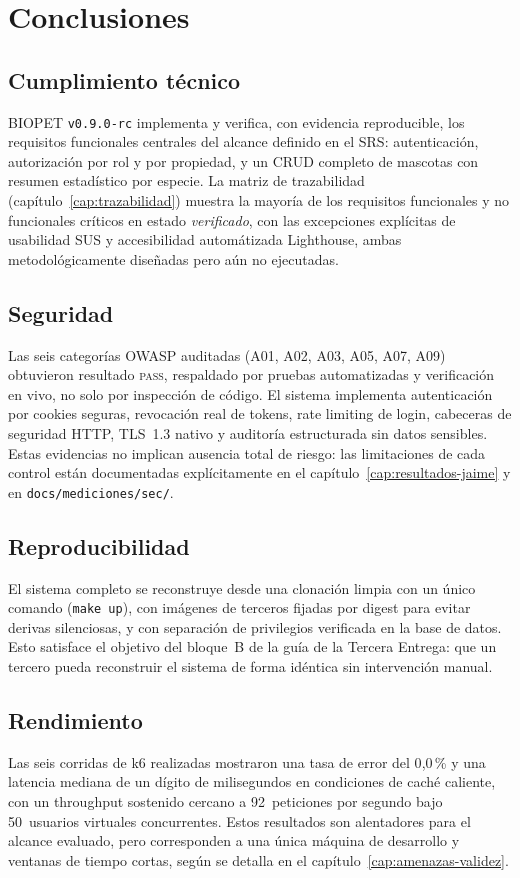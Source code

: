 \chapter{Conclusiones}
\label{cap:conclusiones}

\section{Cumplimiento t\'ecnico}
BIOPET \texttt{v0.9.0-rc} implementa y verifica, con evidencia
reproducible, los requisitos funcionales centrales del alcance definido en
el SRS: autenticaci\'on, autorizaci\'on por rol y por propiedad, y un CRUD
completo de mascotas con resumen estad\'istico por especie. La matriz de
trazabilidad (cap\'itulo~\ref{cap:trazabilidad}) muestra la mayor\'ia de los
requisitos funcionales y no funcionales cr\'iticos en estado
\emph{verificado}, con las excepciones expl\'icitas de usabilidad SUS y
accesibilidad autom\'atizada Lighthouse, ambas metodol\'ogicamente
dise\~nadas pero a\'un no ejecutadas.

\section{Seguridad}
Las seis categor\'ias OWASP auditadas (A01, A02, A03, A05, A07, A09)
obtuvieron resultado \textsc{pass}, respaldado por pruebas automatizadas y
verificaci\'on en vivo, no solo por inspecci\'on de c\'odigo. El sistema
implementa autenticaci\'on por cookies seguras, revocaci\'on real de
tokens, rate limiting de login, cabeceras de seguridad HTTP, TLS~1.3 nativo
y auditor\'ia estructurada sin datos sensibles. Estas evidencias no
implican ausencia total de riesgo: las limitaciones de cada control est\'an
documentadas expl\'icitamente en el cap\'itulo~\ref{cap:resultados-jaime} y
en \texttt{docs/mediciones/sec/}.

\section{Reproducibilidad}
El sistema completo se reconstruye desde una clonaci\'on limpia con un
\'unico comando (\texttt{make up}), con im\'agenes de terceros fijadas por
digest para evitar derivas silenciosas, y con separaci\'on de privilegios
verificada en la base de datos. Esto satisface el objetivo del bloque~B de
la gu\'ia de la Tercera Entrega: que un tercero pueda reconstruir el
sistema de forma id\'entica sin intervenci\'on manual.

\section{Rendimiento}
Las seis corridas de k6 realizadas mostraron una tasa de error del
0{,}0\,\% y una latencia mediana de un d\'igito de milisegundos en
condiciones de cach\'e caliente, con un throughput sostenido cercano a
92~peticiones por segundo bajo 50~usuarios virtuales concurrentes. Estos
resultados son alentadores para el alcance evaluado, pero corresponden a
una \'unica m\'aquina de desarrollo y ventanas de tiempo cortas, seg\'un se
detalla en el cap\'itulo~\ref{cap:amenazas-validez}.

